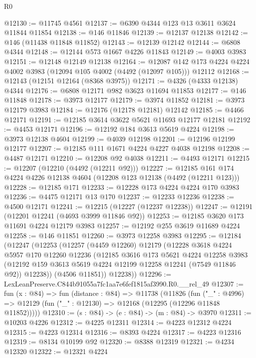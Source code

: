 \begin{lexlean}{R0}
\begin{coremodule}
@12130 := @11745 @4561
@12137 := @6390 @4344 @123 @13 @3611 @3624 @11844 @11854
@12138 := @146 @11846
@12139 := @12137 @12138
@12142 := @146 (@11438 @11848 @11852)
@12143 := @12139 @12142
@12144 := @6808 @4344
@12148 := @12144 @573 @1667 @4226 @11843
@12149 := @4003 @3983
@12151 := @12148 @12149 @12138
@12164 := @12087 @142 @173 @4224 @4224 @4002 @3983 (@12094 @105 @4002 (@4492 (@12097 @105))) @12112
@12168 := @12143 (@12151 @12164 (@8368 @3975))
@12171 := @4326 (@4333 @12138) @4344
@12176 := @6808 @12171 @982 @3623 @11694 @11853
@12177 := @146 @11848
@12178 := @3973 @12177
@12179 := @3974 @11852
@12181 := @3973 @12179 @3983
@12184 := @12176 (@12178 @12181) @12142
@12185 := @4466 @12171
@12191 := @12185 @3614 @3622 @5621 @11693 @12177 @12181
@12192 := @4453 @12171
@12196 := @12192 @184 @3613 @5619 @4224
@12198 := @3973 @12138 @4604
@12199 := @4039 @12198
@12201 := @12196 @12199 @12177
@12207 := @12185 @111 @1671 @4224 @4227 @4038 @12198
@12208 := @4487 @12171
@12210 := @12208 @92 @4038
@12211 := @4493 @12171
@12215 := @12207 (@12210 (@4492 (@12211 @92)))
@12227 := @12185 @161 @174 @4224 @4226 @12138 @4604 (@12208 @123 @12138 (@4492 (@12211 @123)))
@12228 := @12185 @171
@12233 := @12228 @173 @4224 @4224 @170 @3983
@12236 := @4475 @12171 @13 @170
@12237 := @12233 @12236
@12238 := @4500 @12171
@12241 := @12215 (@12227 (@12237 @12238))
@12247 := @12191 (@12201 @12241 (@4693 @3999 @11846 @92))
@12253 := @12185 @3620 @173 @11691 @4224 @12179 @3983
@12257 := @12192 @255 @3619 @11689 @4224
@12258 := @146 @11851
@12260 := @3973 @12258 @3983
@12295 := @12184
    (@12247
      (@12253
        (@12257
          (@4459 @12260)
          @12179
          (@12228
            @3618
            @4224
            @5957
            @170
            @12260
            @12236
            (@12185
              @3616
              @173
              @5621
              @4224
              @12258
              @3983
              (@12192 @159 @3613 @5619 @4224 @12199 @12258 @12241 (@7549 @11846 @92))
              @12238))
          (@4506 @11851))
        @12238))
@12296 := LexLeanPreserve.C844b91055a7fc1aa7e6fef1815af3990.R0.__rel_49
@12307 := fun (x : @84) =>
  fun (distance : @84) =>
  @11738
    (@11826
      (fun ("_" : @4996) => @12129 (fun ("_" : @12130) => @12168 (@12295 (@12296 @11848 @11852)))))
@12310 := (s : @84) -> (e : @84) -> (m : @84) -> @3970
@12311 := @10203 @4226
@12312 := @4225 @12311
@12314 := @4223 @12312 @4224
@12315 := @4223 @12314
@12316 := @8393 @4224
@12317 := @4223 @12316
@12319 := @8134 @10199 @92
@12320 := @8388 @12319
@12321 := @4234 @12320
@12322 := @12321 @4224

\end{coremodule}
\end{lexlean}
